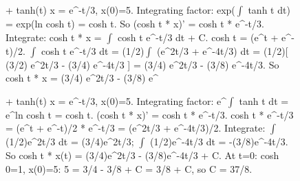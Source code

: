 \begin{figure}[t]
\noindent
\begin{reasoncol}[equal height group=reasODE]
  \par\vspace{1pt}
  \caret{}\par\vspace{4pt}
  \raggedright{} + tanh(t) x = e\textasciicircum{-t/3},
  x(0)=5. Integrating factor: exp($\int$ tanh t dt) = exp(ln cosh t) = cosh t.
  So (cosh t * x)' = cosh t * e\textasciicircum{-t/3}. Integrate: cosh t * x =
  $\int$ cosh t e\textasciicircum{-t/3} dt + C. cosh t = (e\textasciicircum t
  + e\textasciicircum{-t})/2. $\int$ cosh t e\textasciicircum{-t/3} dt =
  (1/2)$\int$ (e\textasciicircum{2t/3} + e\textasciicircum{-4t/3}) dt =
  (1/2)[ (3/2) e\textasciicircum{2t/3} - (3/4) e\textasciicircum{-4t/3} ] =
  (3/4) e\textasciicircum{2t/3} - (3/8) e\textasciicircum{-4t/3}. So cosh t *
  x = (3/4) e\textasciicircum{2t/3} - (3/8) e\textasciicircum{}\par
  \vspace{3pt}\elide
\end{reasoncol}\hspace{\columnsep}%
\begin{reasoncol}[equal height group=reasODE]
  \par\vspace{1pt}
  \caret{}\par\vspace{4pt}
  \raggedright{} + tanh(t) x = e\textasciicircum{-t/3},
  x(0)=5. Integrating factor: e\textasciicircum{$\int$ tanh t dt} =
  e\textasciicircum{ln cosh t} = cosh t. (cosh t * x)' = cosh t *
  e\textasciicircum{-t/3}. cosh t * e\textasciicircum{-t/3} =
  (e\textasciicircum t + e\textasciicircum{-t})/2 * e\textasciicircum{-t/3} =
  (e\textasciicircum{2t/3} + e\textasciicircum{-4t/3})/2. Integrate: $\int$
  (1/2)e\textasciicircum{2t/3} dt = (3/4)e\textasciicircum{2t/3}; $\int$
  (1/2)e\textasciicircum{-4t/3} dt = -(3/8)e\textasciicircum{-4t/3}. So cosh
  t * x(t) = (3/4)e\textasciicircum{2t/3} - (3/8)e\textasciicircum{-4t/3} +
  C. At t=0: cosh 0=1, x(0)=5: 5 = 3/4 - 3/8 + C = 3/8 + C, so C = 37/8.\par
  \vspace{3pt}\elide
\end{reasoncol}\hspace{\columnsep}%
\begin{reasoncol}[equal height group=reasODE]

\end{reasoncol}
\end{figure}
